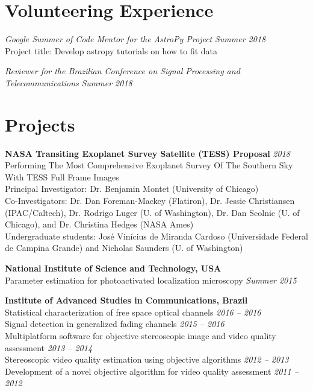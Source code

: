 \documentclass[10pt]{article}
\begin{document}
\begin{titlepage}
\section*{Volunteering Experience}
\emph{Google Summer of Code Mentor for the AstroPy Project} \hfill \textit{Summer 2018}
\\Project title: Develop astropy tutorials on how to fit data
\vspace{.5cm}

\emph{Reviewer for the Brazilian Conference on Signal Processing and Telecommunications} \hfill \textit{Summer 2018}

\section*{Projects}
    \textbf{NASA Transiting Exoplanet Survey Satellite (TESS) Proposal}
    \hfill \textit{2018}\\
    Performing The Most Comprehensive Exoplanet Survey Of The Southern Sky With TESS Full Frame Images\\
    {\small Principal Investigator: Dr. Benjamin Montet (University of Chicago)}\\
    {\small Co-Investigators: Dr. Dan Foreman-Mackey (Flatiron), Dr. Jessie Christiansen (IPAC/Caltech),
    Dr. Rodrigo Luger (U. of Washington), Dr. Dan Scolnic (U. of Chicago), and Dr. Christina Hedges (NASA Ames)}\\
    {\small Undergraduate students: Jos\'e Vin\'icius de Miranda Cardoso (Universidade Federal de Campina Grande) and
    Nicholas Saunders (U. of Washington)}
    \vspace{.5cm}

    \textbf{National Institute of Science and Technology, USA}\\
    Parameter estimation for photoactivated localization microscopy
    \hfill \textit{Summer 2015}
    \vspace{.5cm}

    \textbf{Institute of Advanced Studies in Communications, Brazil}\\
    Statistical characterization of free space optical channels \hfill \emph{2016 -- 2016}  \\
    Signal detection in generalized fading channels \hfill \emph{2015 -- 2016} \\
    Multiplatform software for objective stereoscopic image and video quality assessment \hfill \emph{2013 -- 2014} \\
    Stereoscopic video quality estimation using objective algorithms \hfill \emph{2012 -- 2013} \\
    Development of a novel objective algorithm for video quality assessment \hfill \emph{2011 -- 2012}


\end{titlepage}
\end{document}
